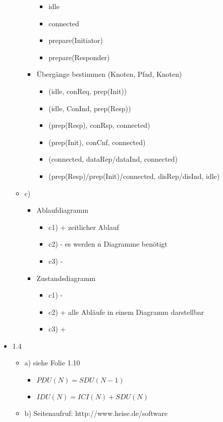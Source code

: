 \documentclass[a4paper, 12pt] {article} %
\begin{document}
\begin{itemize}
\begin{itemize}
\begin{itemize}
		\begin{itemize}
			\item idle
			\item connected
			\item prepare(Initiator)
			\item prepare(Responder)
		\end{itemize}
		\item Übergänge bestimmen (Knoten, Pfad, Knoten)
		\begin{itemize}
			\item (idle, conReq, prep(Init))
			\item (idle, ConInd, prep(Resp))
			\item (prep(Resp), conRsp, connected)
			\item (prep(Init), conCnf, connected)
			\item (connected, dataRep/dataInd, connected) 
			\item (prep(Resp)/prep(Init)/connected, disRep/disInd, idle)
			\end{itemize}
	\end{itemize}
	\item c)
	\begin{itemize}
		\item Ablaufdiagramm
		\begin{itemize}
			\item c1) + zeitlicher Ablauf
			\item c2) - es werden n Diagramme benötigt
			\item c3) - 
		\end{itemize}
		\item Zustandsdiagramm
		\begin{itemize}
			\item c1) - 
			\item c2) + alle Abläufe in einem Diagramm darstellbar
			\item c3) + 
		\end{itemize}
	\end{itemize}
\end{itemize}
\item 1.4
\begin{itemize}
	\item a) siehe Folie 1.10
	\begin{itemize}
		\item \(PDU(N)=SDU(N-1)\)
		\item \(IDU(N)=ICI(N)+SDU(N)\)
	\end{itemize}
	\item b) Seitenaufruf: http://www.heise.de/software

\end{itemize}
\end{itemize}
\end{document}
